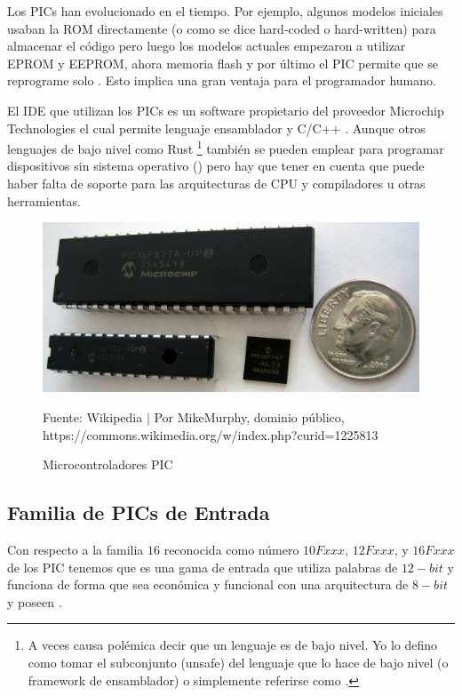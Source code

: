 \documentclass[conference]{IEEEtran}
\begin{document}
    Los PICs han evolucionado en el tiempo. Por ejemplo, algunos modelos iniciales usaban la ROM directamente (o como se dice hard-coded o hard-written) para almacenar el código pero luego los modelos actuales empezaron a utilizar EPROM y EEPROM, ahora memoria flash y por último el PIC permite que se reprograme solo \cite{wikipedia-pic-2022}. Esto implica una gran ventaja para el programador humano.

    \bigbreak

    El IDE que utilizan los PICs es un software propietario del proveedor Microchip Technologies el cual permite lenguaje ensamblador y C/C++ \cite{microchip-technology-inc-2013} \cite{wikipedia-pic-2022}. Aunque otros lenguajes de bajo nivel como Rust \footnote{A veces causa polémica decir que un lenguaje es de bajo nivel. Yo lo defino como tomar el subconjunto (unsafe) del lenguaje que lo hace de bajo nivel (o framework de ensamblador) o simplemente referirse como .} también se pueden emplear para programar dispositivos sin sistema operativo () pero hay que tener en cuenta que puede haber falta de soporte para las arquitecturas de CPU y compiladores u otras herramientas.

    \begin{figure}[H]
        \centering
        \includegraphics[width=0.3\paperwidth]{images/pic-microcontrollers.jpg}
        \caption{Microcontroladores PIC} \footnotesize
        Fuente: Wikipedia $\mid$ Por MikeMurphy, dominio público, https://commons.wikimedia.org/w/index.php?curid=1225813 \cite{wikipedia-pic-2022}
    \end{figure}

    \subsection{Familia de PICs de Entrada}

    Con respecto a la familia $16$ reconocida como número $10Fxxx$, $12Fxxx$, y $16Fxxx$ de los PIC tenemos que es una gama de entrada que utiliza palabras de $12-bit$ y funciona de forma que sea económica y funcional con una arquitectura de $8-bit$ y poseen \cite{microchip-developer-help-2022}.
\end{document}
